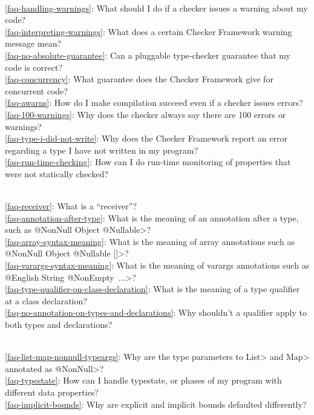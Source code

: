 \\ \ref{faq-handling-warnings}: What should I do if a checker issues a warning about my code?
\\ \ref{faq-interpreting-warnings}: What does a certain Checker Framework warning message mean?
\\ \ref{faq-no-absolute-guarantee}: Can a pluggable type-checker guarantee that my code is correct?
\\ \ref{faq-concurrency}: What guarantee does the Checker Framework give for concurrent code?
\\ \ref{faq-awarns}: How do I make compilation succeed even if a checker issues errors?
\\ \ref{faq-100-warnings}: Why does the checker always say there are 100 errors or warnings?
\\ \ref{faq-type-i-did-not-write}: Why does the Checker Framework report an error regarding a type I have not written in my program?
\\ \ref{faq-run-time-checking}: How can I do run-time monitoring of properties that were not statically checked?

\\ \ref{faq-receiver}: What is a ``receiver''?
\\ \ref{faq-annotation-after-type}: What is the meaning of an annotation after a type, such as \<@NonNull Object @Nullable>?
\\ \ref{faq-array-syntax-meaning}: What is the meaning of array annotations such as \<@NonNull Object @Nullable []>?
\\ \ref{faq-varargs-syntax-meaning}: What is the meaning of varargs annotations such as \<@English String @NonEmpty~...>?
\\ \ref{faq-type-qualifier-on-class-declaration}: What is the meaning of a type qualifier at a class declaration?
\\ \ref{faq-no-annotation-on-types-and-declarations}: Why shouldn't a qualifier apply to both types and declarations?

\\ \ref{faq-list-map-nonnull-typeargs}: Why are the type parameters to \<List> and \<Map> annotated as \<@NonNull>?
\\ \ref{faq-typestate}: How can I handle typestate, or phases of my program with different data properties?
\\ \ref{faq-implicit-bounds}: Why are explicit and implicit bounds defaulted differently?

